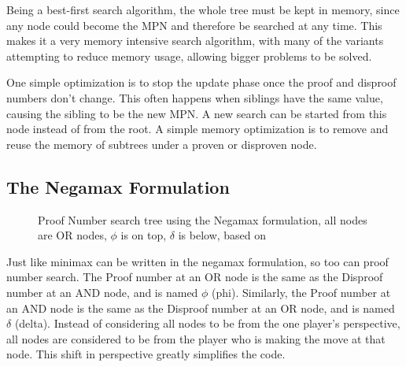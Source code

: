 Being a best-first search algorithm, the whole tree must be kept in memory, since any node could become the MPN and therefore be searched at any time. This makes it a very memory intensive search algorithm, with many of the variants attempting to reduce memory usage, allowing bigger problems to be solved.

One simple optimization is to stop the update phase once the proof and disproof numbers don't change. This often happens when siblings have the same value, causing the sibling to be the new MPN. A new search can be started from this node instead of from the root. A simple memory optimization is to remove and reuse the memory of subtrees under a proven or disproven node.

\subsection{The Negamax Formulation} \label{sec:NegaPDS}

\begin{figure}
\centering
{}
\caption{Proof Number search tree using the Negamax formulation, all nodes are OR nodes, $\phi$ is on top, $\delta$ is below, based on \cite{winands2003-PDS-PN}}
\label{fig:negamaxtree}
\end{figure}

Just like minimax can be written in the negamax formulation, so too can proof number search. The Proof number at an OR node is the same as the Disproof number at an AND node, and is named $\phi$ (phi). Similarly, the Proof number at an AND node is the same as the Disproof number at an OR node, and is named $\delta$ (delta). Instead of considering all nodes to be from the one player's perspective, all nodes are considered to be from the player who is making the move at that node. This shift in perspective greatly simplifies the code.

